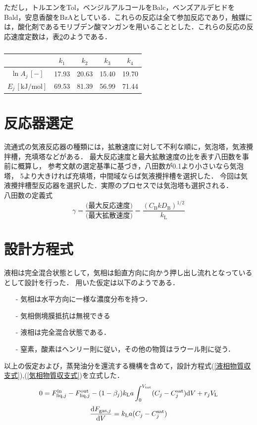 ただし，トルエンをTol，ベンジルアルコールをBalc，ベンズアルデヒドをBald，安息香酸をBzAとしている．これらの反応は全て参加反応であり，触媒には，酸化剤であるモリブデン酸マンガンを用いることとした．これらの反応の反応速度定数は，表\ref{}のようである\cite{}．
\begin{table}
  \centering
  \label{}
  \caption{}
  \begin{tabular}{ccccc}
    \hline
    & $k_1$ & $k_2$ & $k_3$ & $k_4$ \\
    \hline
    $\ln A_j \, [\si{-}]$ & 17.93 & 20.63 & 15.40 & 19.70 \\
    $E_j \, [\si{\kilo \joule \per \mole}]$ & 69.53 & 81.39 & 56.99 & 71.44 \\
    \hline
  \end{tabular}
\end{table}

\section{反応器選定}
流通式の気液反応器の種類には，拡散速度に対して不利な順に，気泡塔，気液攪拌槽，充填塔などがある．
最大反応速度と最大拡散速度の比を表す八田数を事前に概算し，
参考文献\cite{化工便覧}の選定基準に基づき，八田数が0.1より小さいなら気泡塔，
5より大きければ充填塔，中間域ならば気液攪拌槽を選択した．
今回は気液攪拌槽型反応器を選択した．実際のプロセスでは気泡塔も選択される．\\

八田数の定義式
\begin{equation}
    \gamma = \frac{\text{(最大反応速度)}}{\text{(最大拡散速度)}} = \frac{(C_\mathrm{B}kD_\mathrm{B})^{1/2}} {k_\mathrm{L}}
\end{equation}

\section{設計方程式}
液相は完全混合状態として，気相は鉛直方向に向かう押し出し流れとなっているとして設計を行った．
用いた仮定は以下のようである．
\begin{itemize}
    \item[-] 気相は水平方向に一様な濃度分布を持つ．
    \item[-] 気相側境膜抵抗は無視できる
    \item[-] 液相は完全混合状態である．
    \item[-] 窒素，酸素はヘンリー則に従い，その他の物質はラウール則に従う．
\end{itemize}
以上の仮定および，蒸発油分を還流する機構を含めて，設計方程式(\ref{液相物質収支式}),(\ref{気相物質収支式})を立式した．\\
\begin{equation}
    \label{液相物質収支式}
    0 = F^\text{in}_{\text{liq},j} - F^\text{out}_{\text{liq},j} - (1-\beta_j) k_\mathrm{L}a
    \int^{V_\text{tot}}_0(C_j - C^\text{sat}_j) \mathrm{d} V + r_j V_\mathrm{L}
\end{equation}
\begin{equation}
    \label{気相物質収支式}
    \frac{ \mathrm{d} F_{\text{gas},j}}{\mathrm{d} V} = k_\mathrm{L}a (C_j - C^\text{sat}_j)
\end{equation}

